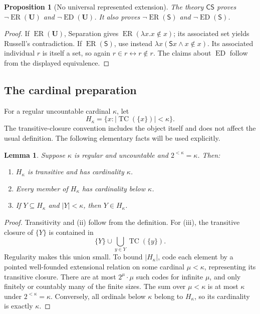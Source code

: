 \documentclass[11pt]{article}
\newtheorem{proposition}[theorem]{Proposition}
\newtheorem{lemma}[theorem]{Lemma}
\theoremstyle{definition}
\newcommand{\ED}{\operatorname{ED}}
\newcommand{\ER}{\operatorname{ER}}
\newcommand{\U}{\mathbf U}
\numberwithin{equation}{section}
\begin{document}
\begin{proposition}[No universal represented extension]
The theory $\mathsf{CS}$ proves $\neg\ER(\U)$ and $\neg\ED(\U)$. It also proves $\neg\ER(\mathsf S)$ and $\neg\ED(\mathsf S)$.
\end{proposition}
\begin{proof}
If $\ER(\U)$, Separation gives $\ER(\lambda x.x\notin x)$; its associated set yields Russell's contradiction. If $\ER(\mathsf S)$, use instead $\lambda x(\mathsf Sx\wedge x\notin x)$. Its associated individual $r$ is itself a set, so again $r\in r\leftrightarrow r\notin r$. The claims about $\ED$ follow from the displayed equivalence.
\end{proof}

\subsection{The cardinal preparation}

For a regular uncountable cardinal $\kappa$, let
$$
H_\kappa=\{x:|\operatorname{TC}(\{x\})|<\kappa\}.
$$
The transitive-closure convention includes the object itself and does not affect the usual definition. The following elementary facts will be used explicitly.

\begin{lemma}\label{lem:hk}
Suppose $\kappa$ is regular and uncountable and $2^{<\kappa}=\kappa$. Then:
\begin{enumerate}[label=(\roman*)]
\item $H_\kappa$ is transitive and has cardinality $\kappa$.
\item Every member of $H_\kappa$ has cardinality below $\kappa$.
\item If $Y\subseteq H_\kappa$ and $|Y|<\kappa$, then $Y\in H_\kappa$.
\end{enumerate}
\end{lemma}
\begin{proof}
Transitivity and (ii) follow from the definition. For (iii), the transitive closure of $\{Y\}$ is contained in
$$
\{Y\}\cup\bigcup_{y\in Y}\operatorname{TC}(\{y\}).
$$
Regularity makes this union small. To bound $|H_\kappa|$, code each element by a pointed well-founded extensional relation on some cardinal $\mu<\kappa$, representing its transitive closure. There are at most $2^\mu\cdot\mu$ such codes for infinite $\mu$, and only finitely or countably many of the finite sizes. The sum over $\mu<\kappa$ is at most $\kappa$ under $2^{<\kappa}=\kappa$. Conversely, all ordinals below $\kappa$ belong to $H_\kappa$, so its cardinality is exactly $\kappa$.
\end{proof}
\end{document}
